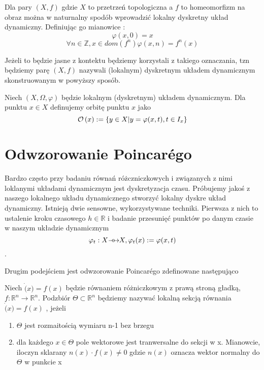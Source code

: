   Dla pary $(X,f) $ gdzie $X$ to przetrzeń topologiczna a $ f $ to homeomorfizm na obraz można w naturnalny spodób wprowadzić 
  lokalny dyskretny układ dynamiczny. Definiując go mianowice :
  $$
        \varphi(x,0) = x  $$ 
        $$
         \forall n \in \mathbb Z , x \in dom(f^n) \varphi(x,n) = f^n(x)
  $$
  
  Jeżeli to będzie jasne z kontektu będziemy korzystali z takiego oznaczania, tzn będziemy parę $(X,f)$ nazywali 
  (lokalnym) dyskretnym układem dynamicznym skonstruowanym w powyższy sposób.

  \begin{definition}
   Niech $(X,\Omega,\varphi) $ będzie lokalnym (dyskretnym) układem dynamicznym. Dla punktu $ x \in X $ definujemy orbitę punktu
   $ x $ jako 
   $$
	\mathcal O\left(x\right) := \{ y \in X |  y = \varphi(x,t) , t \in I_x\}
   $$
  \end{definition}
  
  \section{Odwzorowanie Poincar\'ego}
  
  Bardzo często przy badaniu równań różczniczkowych i związanych z nimi loklanymi układami dynamicznym jest dyskretyzacja czasu.
  Próbujemy jakoś z naszego lokalnego układu dynamicznego stworzyć lokalny dyskre układ dynamiczny. Istnieją dwie sensowne, wykorzystywane
  techniki. Pierwsza z nich to ustalenie kroku czasowego $ h \in \mathbb R $ i badanie przesunięć punktów po danym czasie w naszym układzie dynamicznym
  $$
    \varphi_t : X {\mathrel{\longrightarrow\mkern-25mu\circ}\;\;} X,  \varphi_t(x) := \varphi(x,t)
  $$.
  
  Drugim podejściem jest odwzorowanie Poincar\'ego zdefinowane następująco
  
  \begin{definition}
    Niech $\dot(x) = f(x)$ będzie równaniem różniczkowym z prawą stroną gładką, $ f : \mathbb R^n \to \mathbb R^n$. Podzbiór $ \Theta \subset \mathbb R^n $ 
    będziemy nazywać lokalną sekcją równania $ \dot(x) = f(x) $ , jeżeli
    
    \begin{enumerate}
     \item $ \Theta $ jest rozmaitością wymiaru n-1 bez brzegu
     \item dla każdego $ x \in \Theta$ pole wektorowe jest tranwersalne do sekcji w x.
     Mianowcie, iloczyn sklarany $n(x) \cdot f(x) \neq 0 $ gdzie $n(x)$ oznacza wektor normalny do $ \Theta $ w punkcie x
    \end{enumerate}

  \end{definition}
  

